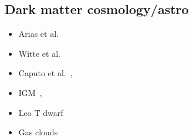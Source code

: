 \documentclass[9pt,twocolumn]{extarticle}
\begin{document}
\begin{mdframed}
\subsection*{Dark matter cosmology/astro}\vspace{-0.5em}
\begin{itemize}\setlength\itemsep{-0.5em}
\item  Arias et al.~\cite{Arias:2012az}
\item Witte et al.~\cite{McDermott:2019lch,Witte:2020rvb}
 \item  Caputo et al.~\cite{Caputo:2020rnx,Caputo:2020bdy}, 
 \item  IGM~\cite{Dubovsky:2015cca},
 \item  Leo T dwarf~\cite{Wadekar:2019xnf}
 \item  Gas clouds~\cite{Bhoonah:2019eyo}
\end{itemize}


\end{mdframed}
\end{document}
